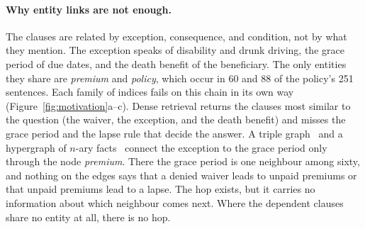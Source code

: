 \documentclass[sigconf, review, anonymous]{acmart}
\begin{document}
\paragraph{Why entity links are not enough.}
The clauses are related by exception, consequence, and condition, not by what they mention. The exception speaks of disability and drunk driving, the grace period of due dates, and the death benefit of the beneficiary. The only entities they share are \emph{premium} and \emph{policy}, which occur in 60 and 88 of the policy's 251 sentences. Each family of indices fails on this chain in its own way (Figure~\ref{fig:motivation}a--c). Dense retrieval returns the clauses most similar to the question (the waiver, the exception, and the death benefit) and misses the grace period and the lapse rule that decide the answer. A triple graph~\cite{edge2024local,gutierrez2025rag} and a hypergraph of $n$-ary facts~\cite{luo2025hypergraphrag} connect the exception to the grace period only through the node \emph{premium}. There the grace period is one neighbour among sixty, and nothing on the edges says that a denied waiver leads to unpaid premiums or that unpaid premiums lead to a lapse. The hop exists, but it carries no information about which neighbour comes next. Where the dependent clauses share no entity at all, there is no hop.
\end{document}
